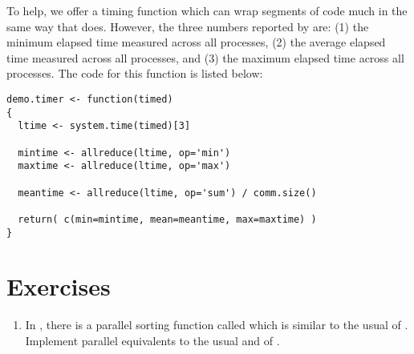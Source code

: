 To help, we offer a timing function  which can wrap segments of code much in the same way that  does.  However, the three numbers reported by  are: (1) the minimum elapsed time measured across all processes, (2) the average elapsed time measured across all processes, and (3) the maximum elapsed time across all processes.  The code for this function is listed below:

\begin{lstlisting}[language=rr,title=Timer Function]
demo.timer <- function(timed)
{
  ltime <- system.time(timed)[3]
  
  mintime <- allreduce(ltime, op='min')
  maxtime <- allreduce(ltime, op='max')
  
  meantime <- allreduce(ltime, op='sum') / comm.size()
  
  return( c(min=mintime, mean=meantime, max=maxtime) )
}
\end{lstlisting}



\section{Exercises}
\label{sec:mpi_for_the_r_user_exercise}

\begin{enumerate}[label=\thechapter-\arabic*]
\item
In , there is a parallel sorting function called
 which is similar to the usual  of .
Implement parallel equivalents to the usual  and 
of .

\end{enumerate}



